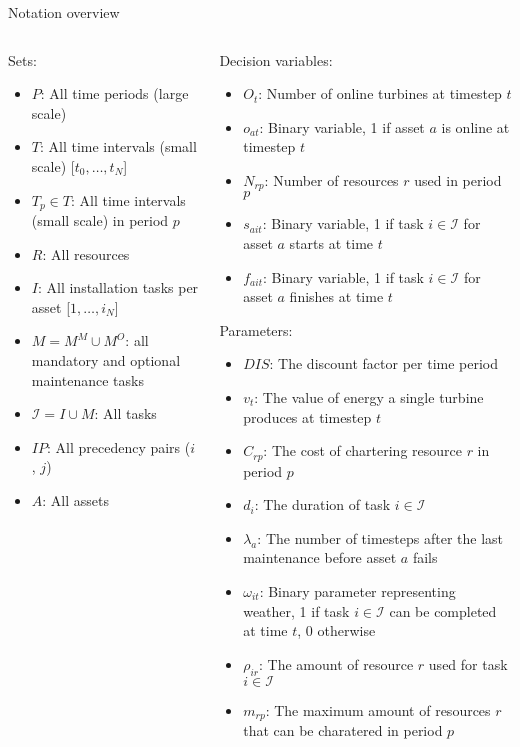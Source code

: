\documentclass{beamer}
\begin{document}
\begin{frame}{Notation overview}
\tiny

\begin{columns}
\begin{column}{.48\textwidth}
Sets:
\begin{itemize}
\item $P$: All time periods (large scale)
\item $T$: All time intervals (small scale) [$t_0, \dots , t_N$]
\item $T_p \in T$: All time intervals (small scale) in period $p$
\item $R$: All resources
\item $I$: All installation tasks per asset [$1, \dots , i_N$]
\item $M = M^M \cup M^O$: all mandatory and optional maintenance tasks
\item $\mathcal{I} = I \cup M$: All tasks
\item $IP$: All precedency pairs ($i$, $j$)
\item $A$: All assets
\end{itemize}
\end{column}

\hfill

\begin{column}{.48\textwidth}
Decision variables:
\begin{itemize}
\item $O_{t}$: Number of online turbines at timestep $t$
\item $o_{at}$: Binary variable, 1 if asset $a$ is online at timestep $t$
\item $N_{rp}$: Number of resources $r$ used in period $p$
\item $s_{ait}$: Binary variable, 1 if task $i \in \mathcal{I}$ for asset $a$ starts at time $t$
\item $f_{ait}$: Binary variable, 1 if task $i \in \mathcal{I}$ for asset $a$ finishes at time $t$
\end{itemize}

Parameters:
\begin{itemize}
\item $DIS$: The discount factor per time period
\item $v_t$: The value of energy a single turbine produces at timestep $t$
\item $C_{rp}$: The cost of chartering resource $r$ in period $p$
\item $d_i$: The duration of task $i \in \mathcal{I}$
\item $\lambda_a$: The number of timesteps after the last maintenance before asset $a$ fails
\item $\omega_{it}$: Binary parameter representing weather, 1 if task $i \in \mathcal{I}$ can be completed at time $t$, 0 otherwise
\item $\rho_{ir}$: The amount of resource $r$ used for task $i \in \mathcal{I}$
\item $m_{rp}$: The maximum amount of resources $r$ that can be charatered in period $p$
\end{itemize}
\end{column}
\end{columns}

\end{frame}
\end{document}
